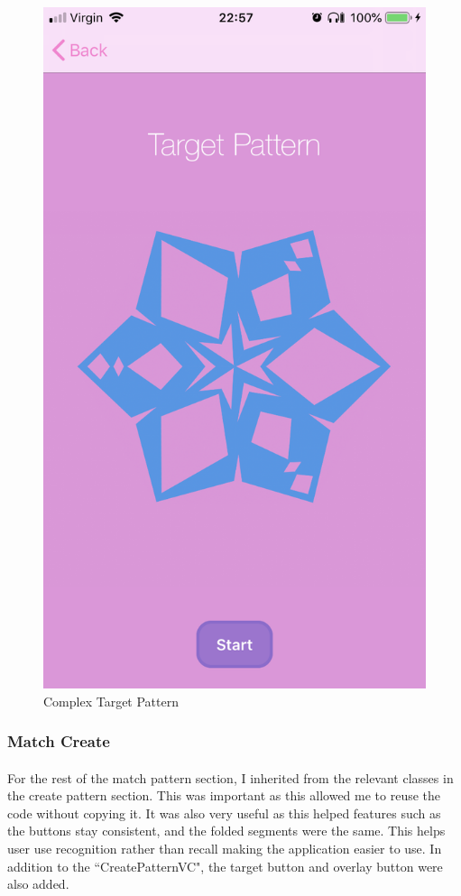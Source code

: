 \documentclass[11pt]{article}
\begin{document}
\begin{figure}[!ht]
\begin{minipage}{0.45\textwidth}
                            \includegraphics[width=0.7\linewidth]{KiriZen/complexTarget.png}
                            \caption{Complex Target Pattern}
                            \label{fig:kiriZen-complexTarget}
                        \end{minipage}
                    \end{figure}
                    
        \subsubsection{Match Create}
            \paragraph{}
            For the rest of the match pattern section, I inherited from the relevant classes in the create pattern section. This was important as this allowed me to reuse the code without copying it. It was also very useful as this helped features such as the buttons stay consistent, and the folded segments were the same. This helps user use recognition rather than recall making the application easier to use. In addition to the ``CreatePatternVC", the target button and overlay button were also added.
            
\end{document}
